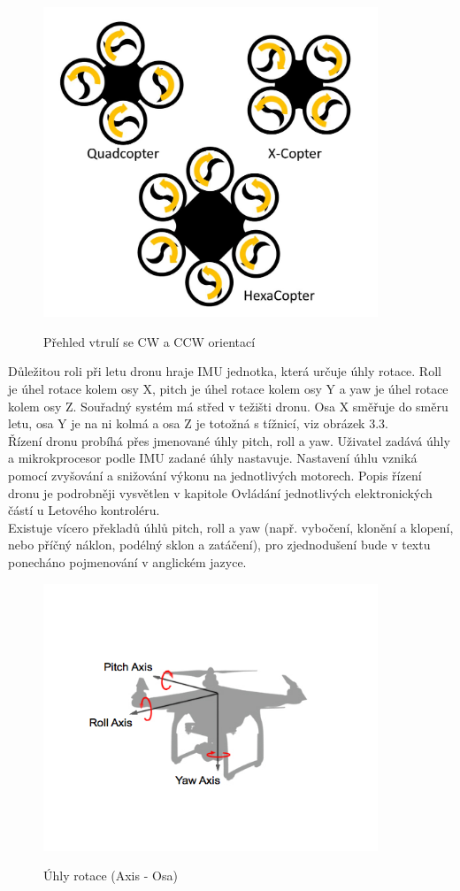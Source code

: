 \begin{figure}[H]
	\centering
	\includegraphics[width=10cm]{pictures/dronrot.png}
	\caption{Přehled vtrulí se CW a CCW orientací}
	\cite{rotdrone}
\end{figure} 
Důležitou roli při letu dronu hraje IMU jednotka, která určuje úhly rotace. Roll je úhel rotace kolem osy X, pitch je úhel rotace kolem osy Y a yaw je úhel rotace kolem osy Z. Souřadný systém má střed v težišti dronu. Osa X směřuje do směru letu, osa Y je na ni kolmá a osa Z je totožná s tížnicí, viz obrázek 3.3.\\
Řízení dronu probíhá přes jmenované úhly pitch, roll a yaw. Uživatel zadává úhly a mikrokprocesor podle IMU zadané úhly nastavuje. Nastavení úhlu vzniká pomocí zvyšování a snižování výkonu na jednotlivých motorech. Popis řízení dronu je podrobněji vysvětlen v kapitole Ovládání jednotlivých elektronických částí u Letového kontroléru.\\
Existuje vícero překladů úhlů pitch, roll a yaw (např. vybočení, klonění a  klopení, nebo příčný náklon, podélný sklon a zatáčení), pro zjednodušení bude v textu ponecháno pojmenování v anglickém jazyce.\\

\begin{figure}[H]
	\centering
	\includegraphics[width=10cm]{pictures/rotangle.png}
	\caption{Úhly rotace (Axis - Osa)}
	\cite{diffdrone}
\end{figure} 
